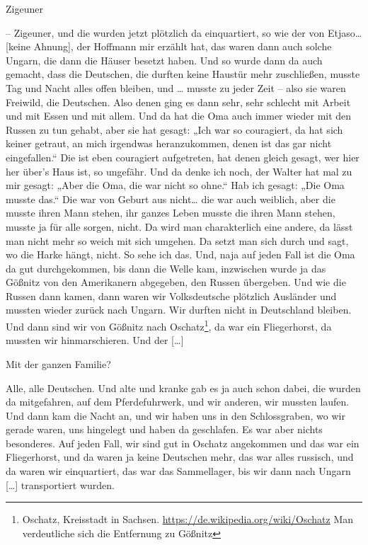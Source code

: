 \documentclass[ngerman,]{article}
\providecommand{\tightlist}{%
  \setlength{\itemsep}{0pt}\setlength{\parskip}{0pt}}
\begin{document}
\begin{multicols}{3}
\begin{description}
\tightlist
\item[Friedrich{[}?{]}]
Zigeuner
\item[Käthe]
– Zigeuner, und die wurden jetzt plötzlich da einquartiert, so wie der
von Etjaso\ldots{} {[}keine Ahnung{]}, der Hoffmann mir erzählt hat, das
waren dann auch solche Ungarn, die dann die Häuser besetzt haben. Und so
wurde dann da auch gemacht, dass die Deutschen, die durften keine
Haustür mehr zuschließen, musste Tag und Nacht alles offen bleiben, und
\ldots{} musste zu jeder Zeit – also sie waren Freiwild, die Deutschen.
Also denen ging es dann sehr, sehr schlecht mit Arbeit und mit Essen und
mit allem. Und da hat die Oma auch immer wieder mit den Russen zu tun
gehabt, aber sie hat gesagt: „Ich war so couragiert, da hat sich keiner
getraut, an mich irgendwas heranzukommen, denen ist das gar nicht
eingefallen.“ Die ist eben couragiert aufgetreten, hat denen gleich
gesagt, wer hier her über's Haus ist, so ungefähr. Und da denke ich
noch, der Walter hat mal zu mir gesagt: „Aber die Oma, die war nicht so
ohne.“ Hab ich gesagt: „Die Oma musste das.“ Die war von Geburt aus
nicht\ldots{} die war auch weiblich, aber die musste ihren Mann stehen,
ihr ganzes Leben musste die ihren Mann stehen, musste ja für alle
sorgen, nicht. Da wird man charakterlich eine andere, da lässt man nicht
mehr so weich mit sich umgehen. Da setzt man sich durch und sagt, wo die
Harke hängt, nicht. So sehe ich das. Und, naja auf jeden Fall ist die
Oma da gut durchgekommen, bis dann die Welle kam, inzwischen wurde ja
das Gößnitz von den Amerikanern abgegeben, den Russen übergeben. Und wie
die Russen dann kamen, dann waren wir Volksdeutsche plötzlich Ausländer
und mussten wieder zurück nach Ungarn. Wir durften nicht in Deutschland
bleiben. Und dann sind wir von Gößnitz nach Oschatz\footnote{Oschatz,
  Kreisstadt in Sachsen. \url{https://de.wikipedia.org/wiki/Oschatz} Man
  verdeutliche sich die Entfernung zu Gößnitz}, da war ein Fliegerhorst,
da mussten wir hinmarschieren. Und der {[}\ldots{}{]}
\item[Ruth]
Mit der ganzen Familie?
\item[Käthe]
Alle, alle Deutschen. Und alte und kranke gab es ja auch schon dabei,
die wurden da mitgefahren, auf dem Pferdefuhrwerk, und wir anderen, wir
mussten laufen. Und dann kam die Nacht an, und wir haben uns in den
Schlossgraben, wo wir gerade waren, uns hingelegt und haben da
geschlafen. Es war aber nichts besonderes. Auf jeden Fall, wir sind gut
in Oschatz angekommen und das war ein Fliegerhorst, und da waren ja
keine Deutschen mehr, das war alles russisch, und da waren wir
einquartiert, das war das Sammellager, bis wir dann nach Ungarn
{[}\ldots{}{]} transportiert wurden.
\end{description}


\end{multicols}
\end{document}
